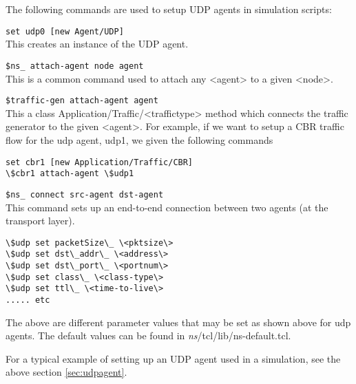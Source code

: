 The following commands are used to setup UDP agents in simulation scripts:
\begin{flushleft}
{\tt set udp0 [new Agent/UDP]}\\
This creates an instance of the UDP agent.


{\tt \$ns\_ attach-agent \<node\> \<agent\>}\\
This is a common command used to attach any <agent> to a given <node>.


{\tt \$traffic-gen attach-agent \<agent\>}\\
This a class Application/Traffic/<traffictype> method which connects the
traffic generator to the given <agent>. For example, if we want to setup
a CBR traffic flow for the udp agent, udp1, we given the following commands\\
\begin{verbatim}
set cbr1 [new Application/Traffic/CBR]
\$cbr1 attach-agent \$udp1
\end{verbatim}


{\tt \$ns\_ connect \<src-agent\> \<dst-agent\>}\\
This command sets up an end-to-end connection between two agents (at the
transport layer).


\begin{verbatim}
\$udp set packetSize\_ \<pktsize\>
\$udp set dst\_addr\_ \<address\>
\$udp set dst\_port\_ \<portnum\>
\$udp set class\_ \<class-type\>
\$udp set ttl\_ \<time-to-live\>
..... etc
\end{verbatim}

The above are different parameter values that may be set as shown above
for udp agents. The default values can be found in 
\emph{ns}/tcl/lib/ns-default.tcl.

For a typical example of setting up an UDP agent used in a simulation, see
the above section \ref{sec:udpagent}.

\end{flushleft}

\endinput
